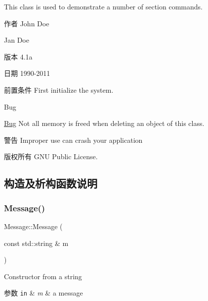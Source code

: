 This class is used to demonstrate a number of section commands. \begin{DoxyAuthor}{作者}
John Doe 

Jan Doe 
\end{DoxyAuthor}
\begin{DoxyVersion}{版本}
4.\+1a 
\end{DoxyVersion}
\begin{DoxyDate}{日期}
1990-\/2011 
\end{DoxyDate}
\begin{DoxyPrecond}{前置条件}
First initialize the system. 
\end{DoxyPrecond}
\begin{DoxyRefDesc}{Bug}
\item[\hyperlink{bug__bug000001}{Bug}]Not all memory is freed when deleting an object of this class. \end{DoxyRefDesc}
\begin{DoxyWarning}{警告}
Improper use can crash your application 
\end{DoxyWarning}
\begin{DoxyCopyright}{版权所有}
G\+NU Public License. 
\end{DoxyCopyright}


\subsection{构造及析构函数说明}
\mbox{\label{classMessage_a2246f9e3015883a76b7a0249c80604ec}} 
\subsubsection{\texorpdfstring{Message()}{Message()}\hspace{0.1cm}{\footnotesize\ttfamily [1/2]}}
{\footnotesize\ttfamily Message\+::\+Message (\begin{DoxyParamCaption}\item[{const std\+::string \&}]{m }\end{DoxyParamCaption})\hspace{0.3cm}{\ttfamily [inline]}}



Constructor from a string 


\begin{DoxyParams}[1]{参数}
\mbox{\tt in}  & {\em m} & a message \\
\hline
\end{DoxyParams}
\mbox{\label{classMessage_ab165b08f675163c9fde8ed2da0c18d3a}} 
